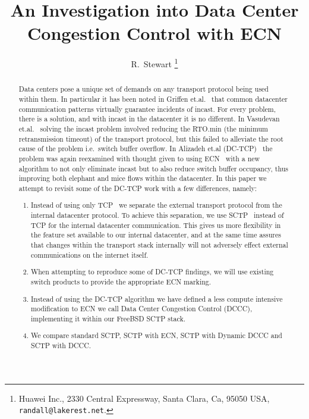 \documentclass[12pt]{article}
\begin{document}
%
%
\title{An Investigation into Data Center Congestion Control with ECN}
\author{R.~Stewart%
        \thanks{Huawei Inc.,
                2330 Central Expressway,
                Santa Clara, Ca, 95050
                USA,
                \texttt{randall@lakerest.net}.}
}

\maketitle


\begin{abstract}
Data centers pose a unique set of demands on any transport protocol being used
within them. In particular it has been noted in Griffen et.al.~\cite{griffen} that common datacenter
communication patterns virtually guarantee incidents of incast. For every problem, there is a solution,
and with incast in the datacenter it is no different. In Vasudevan et.al.~\cite{vasudevan} solving the incast
problem involved reducing the RTO.min (the minimum retransmission timeout) of the transport protocol, but
this failed to alleviate the root cause of the problem i.e.~switch buffer overflow. In Alizadeh et.al (DC-TCP)~\cite{alizadeh} the problem
was again reexamined with thought given to using ECN~\cite{rfc3168}  with a new algorithm to not only eliminate
incast but to also reduce switch buffer occupancy, thus improving both elephant and mice flows
within the datacenter. In this paper we attempt to revisit some of the DC-TCP  work with a few differences, namely:

\begin{enumerate}
 \item  Instead of using only TCP~\cite{rfc793} we separate the external transport protocol from the internal datacenter protocol.
 To achieve this separation, we use SCTP~\cite{rfc4960} instead of TCP for the internal datacenter communication. This gives us more flexibility in the feature set available to our internal datacenter, and at the same
 time assures that changes within the transport stack internally will not adversely effect external communications on
 the internet itself.
\item  When attempting to reproduce some of DC-TCP findings, we will use existing switch products
to provide the appropriate ECN marking.
\item Instead of using the DC-TCP algorithm we have defined a less compute intensive modification
to ECN we call Data Center Congestion Control (DCCC), implementing it within our FreeBSD SCTP stack.
\item We compare standard SCTP, SCTP with ECN, SCTP with Dynamic DCCC and SCTP with DCCC.
\end{enumerate}

\end{abstract}
\end{document}
